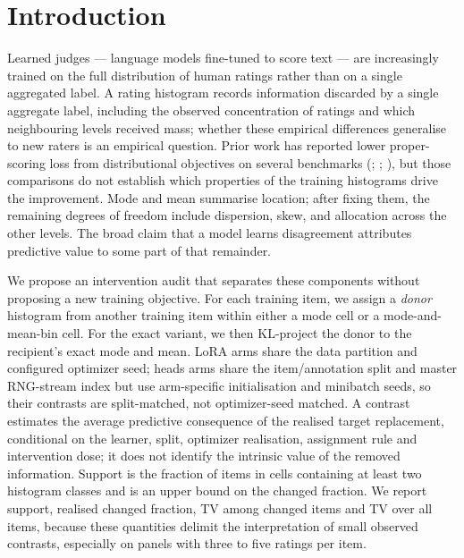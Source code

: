 \documentclass[10pt]{article}
\begin{document}
\section{Introduction}

Learned judges --- language models fine-tuned to score text --- are increasingly trained on the full distribution of human ratings rather than on a single aggregated label. A rating histogram records information discarded by a single aggregate label, including the observed concentration of ratings and which neighbouring levels received mass; whether these empirical differences generalise to new raters is an empirical question. Prior work has reported lower proper-scoring loss from distributional objectives on several benchmarks (\citealp{chen2025beyond}; \citealp{singh2025distributions}; \citealp{kohli2026metric}), but those comparisons do not establish which properties of the training histograms drive the improvement. Mode and mean summarise location; after fixing them, the remaining degrees of freedom include dispersion, skew, and allocation across the other levels. The broad claim that a model learns disagreement attributes predictive value to some part of that remainder.

We propose an intervention audit that separates these components without proposing a new training objective. For each training item, we assign a \emph{donor} histogram from another training item within either a mode cell or a mode-and-mean-bin cell. For the exact variant, we then KL-project the donor to the recipient's exact mode and mean. LoRA arms share the data partition and configured optimizer seed; heads arms share the item/annotation split and master RNG-stream index but use arm-specific initialisation and minibatch seeds, so their contrasts are split-matched, not optimizer-seed matched. A contrast estimates the average predictive consequence of the realised target replacement, conditional on the learner, split, optimizer realisation, assignment rule and intervention dose; it does not identify the intrinsic value of the removed information. Support is the fraction of items in cells containing at least two histogram classes and is an upper bound on the changed fraction. We report support, realised changed fraction, TV among changed items and TV over all items, because these quantities delimit the interpretation of small observed contrasts, especially on panels with three to five ratings per item.
\end{document}
